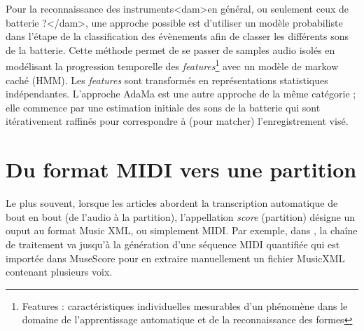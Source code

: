 Pour la reconnaissance des instruments<dam>en général, ou seulement ceux de
batterie ?</dam>, une approche possible \cite{Eronen} est d’utiliser un modèle
probabiliste dans l’étape de la classification des évènements
 afin de
classer les différents sons de la batterie. Cette méthode permet de se
passer de samples audio isolés en modélisant la progression temporelle des
\textit{features}\footnote{Features : caractéristiques individuelles mesurables
d'un phénomène dans le domaine de l'apprentissage automatique et de la
reconnaissance des formes} avec un modèle de markow caché (HMM). Les
\textit{features} sont transformés en représentations statistiques
indépendantes.  L’approche AdaMa \cite{adama_1} est une autre approche
de la même catégorie ; elle commence par une estimation initiale des sons de la
batterie qui sont itérativement raffinés pour correspondre à (pour matcher)
l’enregistrement visé.

\section{Du format MIDI vers une partition}
Le plus souvent, lorsque les articles abordent la transcription automatique de
bout en bout (de l’audio à la partition), l’appellation \textit{score}
(partition) désigne un ouput au format Music XML, ou simplement MIDI. 
Par exemple, dans \cite{SHIBATA2021262}, la chaîne de traitement va jusqu’à la
génération d’une séquence MIDI quantifiée qui est importée dans MuseScore pour
en extraire manuellement un fichier MusicXML contenant plusieurs voix.

